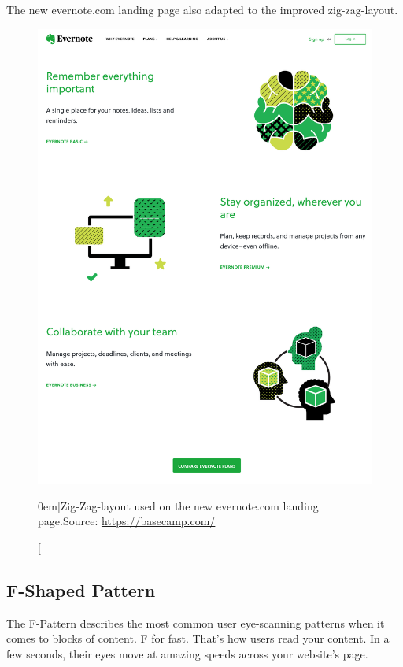 The new evernote.com landing page also adapted to the improved zig-zag-layout.

\begin{figure}%
  \includegraphics[width=1.0\textwidth]{../figures/zig-zag-shape_evernote.png}
  \caption[][0em]{Zig-Zag-layout used on the new evernote.com landing page.\newline Source: \url{https://basecamp.com/}}
  \label{fig:z-shape_facebook}
\end{figure}



\subsection{F-Shaped Pattern} %
\label{sub:f_shaped_pattern}


The F-Pattern describes the most common user eye-scanning patterns when it comes to blocks of content. F for fast. That’s how users read your content. In a few seconds, their eyes move at amazing speeds across your website's page.

